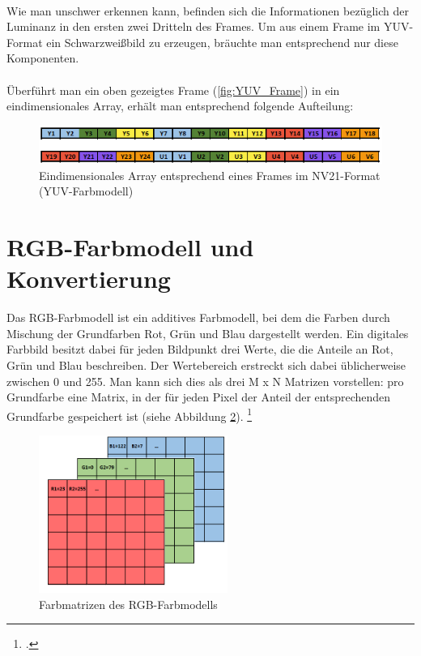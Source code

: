 ~\\
Wie man unschwer erkennen kann, befinden sich die Informationen bezüglich der Luminanz in den ersten zwei Dritteln des Frames. Um aus einem Frame im YUV-Format ein Schwarzweißbild zu erzeugen, bräuchte man entsprechend nur diese Komponenten. 
\\
\\
Überführt man ein oben gezeigtes Frame (\ref{fig:YUV_Frame}) in ein eindimensionales Array, erhält man entsprechend folgende Aufteilung: 

\begin{figure}[h]
	\centering
	\includegraphics[width=1\textwidth]{Bilder/Materialien_und_Grundlagen/YUV_Array.PNG}
	\caption{Eindimensionales Array entsprechend eines Frames im NV21-Format (YUV-Farbmodell)}
	\label{fig:YUV_Array}
\end{figure}

\section{RGB-Farbmodell und Konvertierung} \label{YUV_RGBKonvert}

Das RGB-Farbmodell ist ein additives Farbmodell, bei dem die Farben durch Mischung der Grundfarben Rot, Grün und Blau dargestellt werden. Ein digitales Farbbild besitzt dabei für jeden Bildpunkt drei Werte, die die Anteile an Rot, Grün und Blau beschreiben. Der Wertebereich erstreckt sich dabei üblicherweise zwischen 0 und 255. Man kann sich dies als drei M x N Matrizen vorstellen: pro Grundfarbe eine Matrix, in der für jeden Pixel der Anteil der entsprechenden Grundfarbe gespeichert ist (siehe Abbildung \ref{fig:RGB-Matrizen}). \footcite{MTI2}


\begin{figure}[h]
	\centering
	\includegraphics[width=0.55\textwidth]{Bilder/Materialien_und_Grundlagen/RGB_Matritzen2.png}
	\caption{Farbmatrizen des RGB-Farbmodells}
	\label{fig:RGB-Matrizen}
\end{figure}

